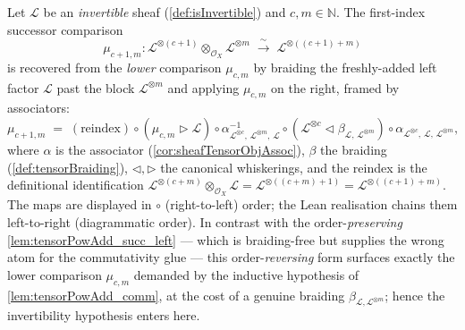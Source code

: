\begin{lemma}\leanok
  \label{lem:tensorPowAdd_succ_left_braided}
  Let \(\mathcal{L}\) be an \emph{invertible} sheaf (\cref{def:isInvertible}) and
  \(c, m \in \mathbb{N}\). The first-index successor comparison
  \[
    \mu_{c+1,m} : \mathcal{L}^{\otimes(c+1)} \otimes_{\mathcal{O}_X}
      \mathcal{L}^{\otimes m} \;\xrightarrow{\ \sim\ }\;
      \mathcal{L}^{\otimes((c+1)+m)}
  \]
  is recovered from the \emph{lower} comparison \(\mu_{c,m}\) by braiding the
  freshly-added left factor \(\mathcal{L}\) past the block \(\mathcal{L}^{\otimes
  m}\) and applying \(\mu_{c,m}\) on the right, framed by associators:
  \[
    \mu_{c+1,m}
      \;=\;
      (\text{reindex})\circ
      (\mu_{c,m} \rhd \mathcal{L})\circ
      \alpha^{-1}_{\mathcal{L}^{\otimes c},\,\mathcal{L}^{\otimes m},\,\mathcal{L}}\circ
      (\mathcal{L}^{\otimes c} \lhd \beta_{\mathcal{L},\,\mathcal{L}^{\otimes m}})\circ
      \alpha_{\mathcal{L}^{\otimes c},\,\mathcal{L},\,\mathcal{L}^{\otimes m}},
  \]
  where \(\alpha\) is the associator (\cref{cor:sheafTensorObjAssoc}), \(\beta\)
  the braiding (\cref{def:tensorBraiding}), \(\lhd,\rhd\) the canonical
  whiskerings, and the reindex is the definitional identification
  \(\mathcal{L}^{\otimes(c+m)}\otimes_{\mathcal{O}_X}\mathcal{L} =
  \mathcal{L}^{\otimes((c+m)+1)} = \mathcal{L}^{\otimes((c+1)+m)}\). The maps are
  displayed in \(\circ\) (right-to-left) order; the Lean realisation chains them
  left-to-right (diagrammatic order). In contrast with the
  order-\emph{preserving} \cref{lem:tensorPowAdd_succ_left} --- which is
  braiding-free but supplies the wrong atom for the commutativity glue --- this
  order-\emph{reversing} form surfaces exactly the lower comparison \(\mu_{c,m}\)
  demanded by the inductive hypothesis of \cref{lem:tensorPowAdd_comm}, at the
  cost of a genuine braiding \(\beta_{\mathcal{L},\mathcal{L}^{\otimes m}}\);
  hence the invertibility hypothesis enters here.
\end{lemma}

